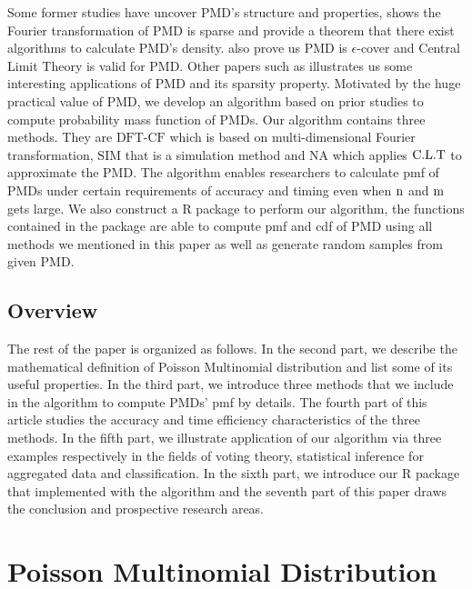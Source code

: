 \documentclass[12pt]{article}
\newcommand{\PMD}{\textrm{PMD}}
\newcommand{\SIM}{{\textrm{SIM}}}
\newcommand{\NA}{{\textrm{NA}}}
\newcommand{\dft}{{\textrm{DFT-CF}}}
\begin{document}


Some former studies have uncover $\PMD$'s structure and properties,  shows the Fourier transformation of $\PMD$ is sparse and provide a theorem that there exist algorithms to calculate PMD's density.  also prove us PMD is $\epsilon$-cover and Central Limit Theory is valid for PMD. Other papers such as  illustrates us some interesting applications of PMD and its sparsity property. Motivated by the huge practical value of $\PMD$, we develop an algorithm based on prior studies to compute probability mass function of $\PMD$s. Our algorithm contains three methods. They are $\dft$ which is based on multi-dimensional Fourier transformation, $\SIM$ that is a simulation method and $\NA$ which applies ${\rm C.L.T}$ to approximate the $\PMD$. The algorithm enables researchers to calculate pmf of $\PMD$s under certain requirements of accuracy and timing even when $\rm n$ and $\rm m$ gets large. We also construct a R package to perform our algorithm, the functions contained in the package are able to compute pmf and cdf of $\PMD$ using all methods we mentioned in this paper as well as generate random samples from given $\PMD$.





\subsection{Overview}
The rest of the paper is organized as follows. In the second part, we describe the mathematical definition of Poisson Multinomial distribution and list some of its useful properties. In the third part, we introduce three methods that we include in the algorithm to compute $\PMD$s' pmf by details. The fourth part of this article studies the accuracy and time efficiency characteristics of the three methods. In the fifth part, we illustrate application of our algorithm via three examples respectively in the fields of voting theory, statistical inference for aggregated data and classification. In the sixth part, we introduce our R package that implemented with the algorithm and the seventh part of this paper draws the conclusion and prospective research areas.




\section{Poisson Multinomial Distribution}
\end{document}
